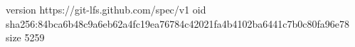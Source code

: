 version https://git-lfs.github.com/spec/v1
oid sha256:84bca6b48c9a6eb62a4fc19ea76784c42021fa4b4102ba6441c7b0c80fa96e78
size 5259
